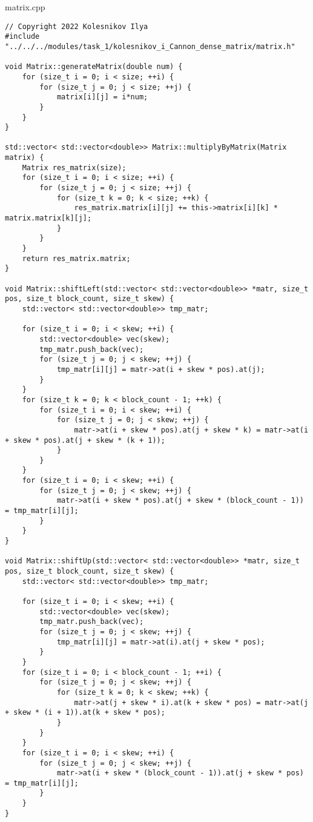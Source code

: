 \documentclass{report}
\begin{document}
matrix.cpp
\begin{lstlisting}
// Copyright 2022 Kolesnikov Ilya
#include "../../../modules/task_1/kolesnikov_i_Cannon_dense_matrix/matrix.h"

void Matrix::generateMatrix(double num) {
    for (size_t i = 0; i < size; ++i) {
        for (size_t j = 0; j < size; ++j) {
            matrix[i][j] = i*num;
        }
    }
}

std::vector< std::vector<double>> Matrix::multiplyByMatrix(Matrix matrix) {
    Matrix res_matrix(size);
    for (size_t i = 0; i < size; ++i) {
        for (size_t j = 0; j < size; ++j) {
            for (size_t k = 0; k < size; ++k) {
                res_matrix.matrix[i][j] += this->matrix[i][k] * matrix.matrix[k][j];
            }
        }
    }
    return res_matrix.matrix;
}

void Matrix::shiftLeft(std::vector< std::vector<double>> *matr, size_t pos, size_t block_count, size_t skew) {
    std::vector< std::vector<double>> tmp_matr;

    for (size_t i = 0; i < skew; ++i) {
        std::vector<double> vec(skew);
        tmp_matr.push_back(vec);
        for (size_t j = 0; j < skew; ++j) {
            tmp_matr[i][j] = matr->at(i + skew * pos).at(j);
        }
    }
    for (size_t k = 0; k < block_count - 1; ++k) {
        for (size_t i = 0; i < skew; ++i) {
            for (size_t j = 0; j < skew; ++j) {
                matr->at(i + skew * pos).at(j + skew * k) = matr->at(i + skew * pos).at(j + skew * (k + 1));
            }
        }
    }
    for (size_t i = 0; i < skew; ++i) {
        for (size_t j = 0; j < skew; ++j) {
            matr->at(i + skew * pos).at(j + skew * (block_count - 1)) = tmp_matr[i][j];
        }
    }
}

void Matrix::shiftUp(std::vector< std::vector<double>> *matr, size_t pos, size_t block_count, size_t skew) {
    std::vector< std::vector<double>> tmp_matr;

    for (size_t i = 0; i < skew; ++i) {
        std::vector<double> vec(skew);
        tmp_matr.push_back(vec);
        for (size_t j = 0; j < skew; ++j) {
            tmp_matr[i][j] = matr->at(i).at(j + skew * pos);
        }
    }
    for (size_t i = 0; i < block_count - 1; ++i) {
        for (size_t j = 0; j < skew; ++j) {
            for (size_t k = 0; k < skew; ++k) {
                matr->at(j + skew * i).at(k + skew * pos) = matr->at(j + skew * (i + 1)).at(k + skew * pos);
            }
        }
    }
    for (size_t i = 0; i < skew; ++i) {
        for (size_t j = 0; j < skew; ++j) {
            matr->at(i + skew * (block_count - 1)).at(j + skew * pos) = tmp_matr[i][j];
        }
    }
}


\end{lstlisting}
\end{document}
